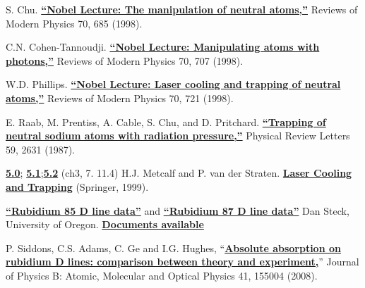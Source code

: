 \documentclass{../lab}
\begin{document}
\begin{thebibliography}{}
\label{sec:References}
     S. Chu. \href{http://physics111.lib.berkeley.edu/Physics111/Reprints/MOT/Steven\_Chu-Neutral\_Particles.pdf}{\textbf{``Nobel Lecture: The manipulation of neutral atoms,''}} Reviews of Modern Physics 70, 685 (1998).

     C.N. Cohen-Tannoudji. \href{http://physics111.lib.berkeley.edu/Physics111/Reprints/MOT/Cohen-Tannoudji\_RMP\_70-707.pdf}{\textbf{``Nobel Lecture: Manipulating atoms with photons,''}} Reviews of Modern Physics 70, 707 (1998).

     W.D. Phillips. \href{http://physics111.lib.berkeley.edu/Physics111/Reprints/MOT/W.Philips_RMP_70-3-1998_p721_1.pdf}{\textbf{``Nobel Lecture: Laser cooling and trapping of neutral atoms,''}} Reviews of Modern Physics 70, 721 (1998).

     E. Raab, M. Prentiss, A. Cable, S. Chu, and D. Pritchard. \href{http://physics111.lib.berkeley.edu/Physics111/Reprints/MOT/Raab_Prentiss_Chu_PRL_v59-23-1987.pdf}{\textbf{``Trapping of neutral sodium atoms with radiation pressure,''}} Physical Review Letters 59, 2631 (1987).

     \href{http://physics111.lib.berkeley.edu/Physics111/Reprints/MOT/Laser\_Cooling\_and\_Trapping\_HJ\_Metcalf/MOT\%20OCR\%20ch.\%203\%20force\%20on\%20two-level\%20atoms.pdf}{\textbf{5.0}}; \href{http://physics111.lib.berkeley.edu/Physics111/Reprints/MOT/Laser\_Cooling\_and\_Trapping\_HJ\_Metcalf/MOT\%20OCR\%20ch.\%207\%20optical\%20molasses.pdf}{\textbf{5.1}};\href{http://physics111.lib.berkeley.edu/Physics111/Reprints/MOT/Laser\_Cooling\_and\_Trapping\_HJ\_Metcalf/MOT\%20OCR\%20\%20ch.\%2011.4\%20magneto-optical\%20traps.pdf}{\textbf{5.2}} (ch3, 7. 11.4) H.J. Metcalf and P. van der Straten. \href{http://physics111.lib.berkeley.edu/Physics111/Reprints/MOT/Laser\_Cooling\_and\_Trapping\_HJ\_Metcalf/}{\textbf{Laser Cooling and Trapping}} (Springer, 1999).

     \href{http://physics111.lib.berkeley.edu/Physics111/Reprints/MOT/rubidium85numbers.pdf}{\textbf{``Rubidium 85 D line data''}} and \href{http://physics111.lib.berkeley.edu/Physics111/Reprints/MOT/rubidium87numbers.pdf}{\textbf{``Rubidium 87 D line data''}} Dan Steck, University of Oregon. \href{http://steck.us/alkalidata/}{\textbf{Documents available}}

     P. Siddons, C.S. Adams, C. Ge and I.G. Hughes, ``\href{http://physics111.lib.berkeley.edu/Physics111/Reprints/MOT/Absolute\%20absorption\%20on\%20the\%20rubidium\%20D\%20lines-0805.1139v1.pdf}{\textbf{Absolute absorption on rubidium D lines: comparison between theory and experiment,}}'' Journal of Physics B: Atomic, Molecular and Optical Physics 41, 155004 (2008).


\end{thebibliography}
\end{document}
